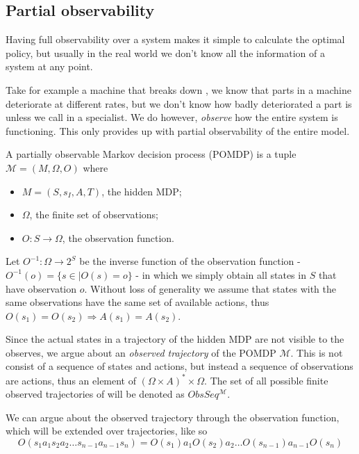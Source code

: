 \subsection{Partial observability}
Having full observability over a system makes it simple to calculate the optimal policy, but usually in the real world we don't know all the information of a system at any point. 

Take for example a machine that breaks down , we know that parts in a machine deteriorate at different rates, but we don't know how badly deteriorated a part is unless we call in a specialist. We do however, \textit{observe} how the entire system is functioning. This only provides up with partial observability of the entire model. 

\begin{definition}[POMDP]
	A partially observable Markov decision process (POMDP) is a tuple $\mathcal{M}=(M, \Omega, O)$ where 
	\begin{itemize}
		\item $M=(S,s_I,A,T)$, the hidden MDP;
		\item $\Omega$, the finite set of observations;
		\item $O:S\to \Omega$, the observation function. 
	\end{itemize}
\end{definition}

Let $O^{-1}:\Omega\to 2^S$ be the inverse function of the observation function - $O^{-1}(o)=\{s\in \mid O(s)=o\}$ - in which we simply obtain all states in $S$ that have observation $o$.
Without loss of generality we assume that states with the same observations have the same set of available actions, thus $O(s_1)=O(s_2)\Rightarrow A(s_1)=A(s_2)$.

Since the actual states in a trajectory of the hidden MDP are not visible to the observes, we argue about an \textit{observed trajectory} of the POMDP $\mathcal{M}$. This is not consist of a sequence of states and actions, but instead a sequence of observations are actions, thus an element of $(\Omega\times A)^*\times \Omega$. The set of all possible finite observed trajectories of will be denoted as $ObsSeq^{\mathcal{M}}$.

We can argue about the observed trajectory through the observation function, which will be extended over trajectories, like so
\[O(s_1 a_1 s_2 a_2\dots s_{n-1} a_{n-1} s_n) = O(s_1) a_1 O(s_2) a_2\dots O(s_{n-1}) a_{n-1} O(s_n)\]


